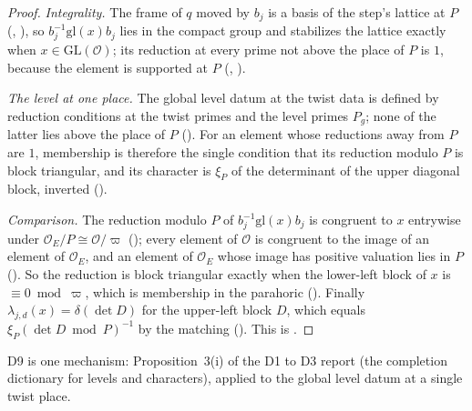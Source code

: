 \documentclass[11pt]{article}
\newcommand{\Ok}{\mathcal O}
\newcommand{\OEr}{\mathcal O_E}
\newcommand{\GL}{\mathrm{GL}}
\theoremstyle{definition}
\theoremstyle{remark}
\begin{document}
\begin{proof}
\emph{Integrality.} The frame of $q$ moved by $b_j$ is a basis of the step's lattice at $P$ (, ), so $b_j^{-1}\mathrm{gl}(x)b_j$ lies in the compact group and stabilizes the lattice exactly when $x\in\GL(\Ok)$; its reduction at every prime not above the place of $P$ is $1$, because the element is supported at $P$ (, ).

\emph{The level at one place.} The global level datum at the twist data is defined by reduction conditions at the twist primes and the level primes $P_g$; none of the latter lies above the place of $P$ (). For an element whose reductions away from $P$ are $1$, membership is therefore the single condition that its reduction modulo $P$ is block triangular, and its character is $\xi_P$ of the determinant of the upper diagonal block, inverted ().

\emph{Comparison.} The reduction modulo $P$ of $b_j^{-1}\mathrm{gl}(x)b_j$ is congruent to $x$ entrywise under $\OEr/P\cong\Ok/\varpi$ (); every element of $\Ok$ is congruent to the image of an element of $\OEr$, and an element of $\OEr$ whose image has positive valuation lies in $P$ (). So the reduction is block triangular exactly when the lower-left block of $x$ is $\equiv0\bmod\varpi$, which is membership in the parahoric (). Finally $\lambda_{j,d}(x)=\delta(\det D)$ for the upper-left block $D$, which equals $\xi_P(\det D\bmod P)^{-1}$ by the matching (). This is .
\end{proof}

D9 is one mechanism: Proposition~3(i) of the D1 to D3 report (the completion dictionary for levels and characters), applied to the global level datum at a single twist place.

\section{\texorpdfstring{}{ramBijective\_holds}}\label{sec:F}
\end{document}

